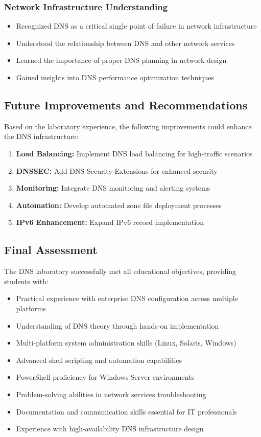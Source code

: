 \documentclass[12pt,a4paper]{article}
\begin{document}
\subsubsection{Network Infrastructure Understanding}
\begin{itemize}
    \item Recognized DNS as a critical single point of failure in network infrastructure
    \item Understood the relationship between DNS and other network services
    \item Learned the importance of proper DNS planning in network design
    \item Gained insights into DNS performance optimization techniques
\end{itemize}

\subsection{Future Improvements and Recommendations}

Based on the laboratory experience, the following improvements could enhance the DNS infrastructure:

\begin{enumerate}
    \item \textbf{Load Balancing:} Implement DNS load balancing for high-traffic scenarios
    \item \textbf{DNSSEC:} Add DNS Security Extensions for enhanced security
    \item \textbf{Monitoring:} Integrate DNS monitoring and alerting systems
    \item \textbf{Automation:} Develop automated zone file deployment processes
    \item \textbf{IPv6 Enhancement:} Expand IPv6 record implementation
\end{enumerate}

\subsection{Final Assessment}

The DNS laboratory successfully met all educational objectives, providing students with:
\begin{itemize}
    \item Practical experience with enterprise DNS configuration across multiple platforms
    \item Understanding of DNS theory through hands-on implementation
    \item Multi-platform system administration skills (Linux, Solaris, Windows)
    \item Advanced shell scripting and automation capabilities
    \item PowerShell proficiency for Windows Server environments
    \item Problem-solving abilities in network services troubleshooting
    \item Documentation and communication skills essential for IT professionals
    \item Experience with high-availability DNS infrastructure design
\end{itemize}
\end{document}
